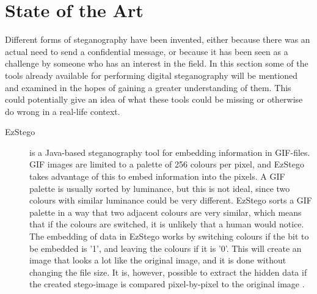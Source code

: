 \section{State of the Art}
\label{sec:SOTA}
Different forms of steganography have been invented, either because there was an actual need to send a confidential message, or because it has been seen as a challenge by someone who has an interest in the field.
In this section some of the tools already available for performing digital steganography will be mentioned and examined in the hopes of gaining a greater understanding of them.
This could potentially give an idea of what these tools could be missing or otherwise do wrong in a real-life context. 

\begin{description}
	\item[EzStego] is a Java-based steganography tool for embedding information in GIF-files. 
	GIF images are limited to a palette of 256 colours per pixel, and EzStego takes advantage of this to embed information into the pixels.
	A GIF palette is usually sorted by luminance, but this is not ideal, since two colours with similar luminance could be very different.
	EzStego sorts a GIF palette in a way that two adjacent colours are very similar, which means that if the colours are switched, it is unlikely that a 		human would notice.
	The embedding of data in EzStego works by switching colours if the bit to be embedded is '1', and leaving the colours if it is '0'.
	This will create an image that looks a lot like the original image, and it is done without changing the file size.
	It is, however, possible to extract the hidden data if the created stego-image is compared pixel-by-pixel to the original image \citep{Westfeld_2000}.
	


\end{description}
